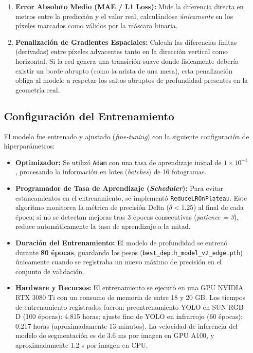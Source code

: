 \documentclass[12pt, a4, twoside, openany]{report}
\begin{document}
\begin{enumerate}
    \item \textbf{Error Absoluto Medio (MAE / L1 Loss):} Mide la diferencia directa en metros entre la predicción y el valor real, calculándose \textit{únicamente} en los píxeles marcados como válidos por la máscara binaria.
    \item \textbf{Penalización de Gradientes Espaciales:} Calcula las diferencias finitas (derivadas) entre píxeles adyacentes tanto en la dirección vertical como horizontal. Si la red genera una transición suave donde físicamente debería existir un borde abrupto (como la arista de una mesa), esta penalización obliga al modelo a respetar los saltos abruptos de profundidad presentes en la geometría real.
\end{enumerate}

\subsection{Configuración del Entrenamiento}

El modelo fue entrenado y ajustado (\textit{fine-tuning}) con la siguiente configuración de hiperparámetros:

\begin{itemize}
    \item \textbf{Optimizador:} Se utilizó \texttt{Adam} con una tasa de aprendizaje inicial de $1\times 10^{-4}$, procesando la información en lotes (\textit{batches}) de 16 fotogramas.
    \item \textbf{Programador de Tasa de Aprendizaje (\textit{Scheduler}):} Para evitar estancamientos en el entrenamiento, se implementó \texttt{ReduceLROnPlateau}. Este algoritmo monitorea la métrica de precisión Delta ($\delta < 1.25$) al final de cada época; si no se detectan mejoras tras 3 épocas consecutivas (\textit{patience = 3}), reduce automáticamente la tasa de aprendizaje a la mitad.
    \item \textbf{Duración del Entrenamiento:} El modelo de profundidad se entrenó durante \textbf{80 épocas}, guardando los pesos (\texttt{best\_depth\_model\_v2\_edge.pth}) únicamente cuando se registraba un nuevo máximo de precisión en el conjunto de validación.
    \item \textbf{Hardware y Recursos:} El entrenamiento se ejecutó en una GPU NVIDIA RTX 3080 Ti con un consumo de memoria de entre 18 y 20 GB. Los tiempos de entrenamiento registrados fueron: preentrenamiento YOLO en SUN RGB-D (100 épocas): 4.815 horas; ajuste fino de YOLO en infrarrojo (60 épocas): 0.217 horas (aproximadamente 13 minutos). La velocidad de inferencia del modelo de segmentación es de 3.6 ms por imagen en GPU A100, y aproximadamente 1.2 s por imagen en CPU.
\end{itemize}
\end{document}
